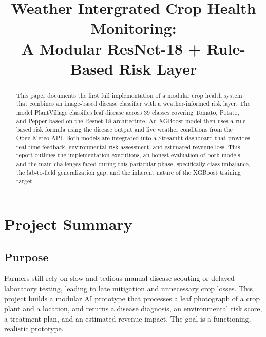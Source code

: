\documentclass[conference]{IEEEtran}
\begin{document}
\title{Weather Intergrated Crop Health Monitoring:\\
A Modular ResNet-18 + Rule-Based Risk Layer}

\author{
}

\maketitle

\begin{abstract}
This paper documents the first full implementation of a modular crop health system that combines an image-based disease classifier with a weather-informed risk layer. The model PlantVillage classifies leaf disease across 39 classes covering Tomato, Potato, and Pepper based on the Resnet-18 architecture. An XGBoost model then uses a rule-based risk formula using the disease output and live weather conditions from the Open-Meteo API. Both models are integrated into a Streamlit dashboard that provides real-time feedback, environmental risk assessment, and estimated revenue loss. This report outlines the implementation executions, an honest evaluation of both models, and the main challenges faced during this particular phase, specifically class imbalance, the lab-to-field generalization gap, and the inherent nature of the XGBoost training target.
\end{abstract}

\section{Project Summary}

\subsection{Purpose}
Farmers still rely on slow and tedious manual disease scouting or delayed laboratory testing, leading to late mitigation and unnecessary crop losses. This project builds a modular AI prototype that processes a leaf photograph of a crop plant and a location, and returns a disease diagnosis, an environmental risk score, a treatment plan, and an estimated revenue impact. The goal is a functioning, realistic prototype.
\end{document}
